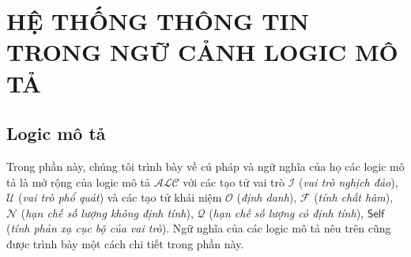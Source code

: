 \documentclass[12pt,a4paper,twoside]{report}
\newcommand{\mI}		{\mathcal{I}}
\newcommand{\mO}		{\mathcal{O}}
\newcommand{\mN}		{\mathcal{N}}
\newcommand{\mQ}		{\mathcal{Q}}
\newcommand{\mF}		{\mathcal{F}}
\newcommand{\mU}		{\mathcal{U}}
\newcommand{\Self}		{\mathsf{Self}}
\newcommand{\ALC}		{$\mathcal{ALC}$\xspace}
\theoremstyle{definition}
\begin{document}

\renewcommand\listfigurename{DANH MỤC HÌNH VẼ}
\listoffigures
\newpage
\thispagestyle{empty}
\mbox{}
\addtocounter{page}{-1}
\newpage

\pagebreak[4]


\chapter{HỆ THỐNG THÔNG TIN TRONG NGỮ CẢNH LOGIC MÔ TẢ}
\label{chap:InfoSys}
\section{Logic mô tả}
\label{sec:DescriptionLogic}
Trong phần này, chúng tôi trình bày về cú pháp và ngữ nghĩa của họ các logic mô tả là mở rộng của logic mô tả \ALC với các tạo tử vai trò $\mI$ ({\em vai trò nghịch đảo}), $\mU$ ({\em vai trò phổ quát}) và các tạo tử khái niệm $\mO$ ({\em định danh}), $\mF$ ({\em tính chất hàm}), $\mN$ ({\em hạn chế số lượng không định tính}), $\mQ$ ({\em hạn chế số lượng có định tính}), $\Self$ ({\em tính phản xạ cục bộ của vai trò}). Ngữ nghĩa của các logic mô tả nêu trên cũng được trình bày một cách chi tiết trong phần này.
\end{document}
